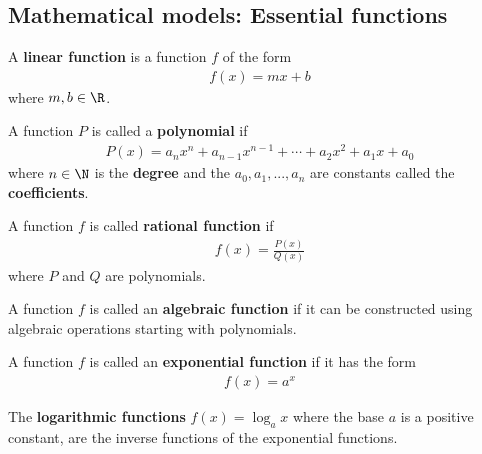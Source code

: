 \documentclass{article}
\begin{document}
\subsection{Mathematical models: Essential functions}
\begin{definition}
	A \textbf{linear function} is a function $f$ of the form
	\begin{align*}
		f(x) = mx + b
	\end{align*}
	where $m, b\in\R$.
\end{definition}
\begin{definition}
	A function $P$ is called a \textbf{polynomial} if
	\begin{align*}
		P(x) = a_nx^n+a_{n-1}x^{n-1}+\cdots +a_2x^2 + a_1x+a_0
	\end{align*}
	where $n\in\N$ is the \textbf{degree} and the $a_0, a_1, ..., a_n$ are constants called the \textbf{coefficients}.
\end{definition}
\begin{definition}
	A function $f$ is called \textbf{rational function} if
	\begin{align*}
		f(x) = \frac{P(x)}{Q(x)}
	\end{align*}
	where $P$ and $Q$ are polynomials.
\end{definition}
\begin{definition}
	A function $f$ is called an \textbf{algebraic function} if it can be constructed using algebraic operations starting with polynomials.
\end{definition}
\begin{definition}
	A function $f$ is called an \textbf{exponential function} if it has the form
	\begin{align*}
		f(x) = a^x
	\end{align*}
\end{definition}
\begin{definition}
	The \textbf{logarithmic functions} $f(x) = \log_ax$ where the base $a$ is a positive constant, are the inverse functions of the exponential functions.
\end{definition}
\end{document}
